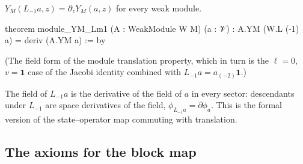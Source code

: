 \begin{proposition}\label{ch10:prop:YMLm1}
$Y_M(L_{-1}a,z)=\partial_zY_M(a,z)$ for every weak module.
\end{proposition}
\begin{leancode}
theorem module_YM_Lm1 (A : WeakModule W M) (a : 𝒱) :
    A.YM (W.L (-1) a) = deriv (A.YM a) := by
\end{leancode}
(The field form of the module translation property, which in turn is the $\ell=0$, $v=\mathbf 1$
case of the Jacobi identity combined with $L_{-1}a=a_{(-2)}\mathbf 1$.)

\begin{physics}
The field of $L_{-1}a$ is the derivative of the field of $a$ in every sector: descendants under $L_{-1}$ are space derivatives of the field, $\phi_{L_{-1}a}=\partial\phi_a$. This is the formal version of the state--operator map commuting with translation.
\end{physics}

\subsection{The axioms for the block map}

